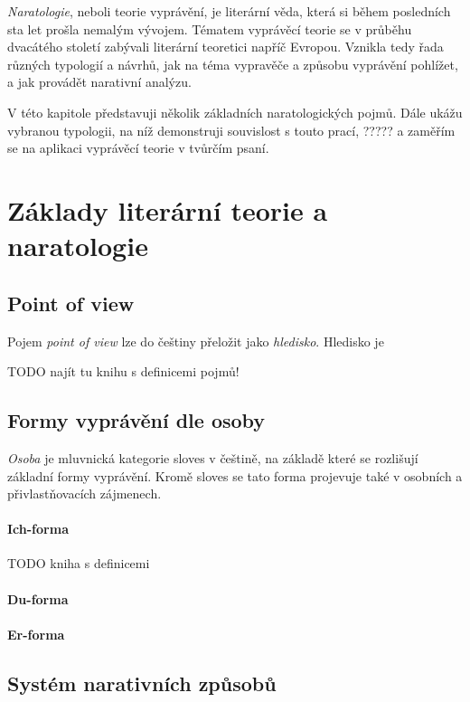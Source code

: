 \emph{Naratologie}, neboli teorie vyprávění, je literární věda, která si během posledních sta let prošla nemalým vývojem. Tématem vyprávěcí teorie se v průběhu dvacátého století zabývali literární teoretici napříč Evropou. Vznikla tedy řada různých typologií a návrhů, jak na téma vypravěče a způsobu vyprávění pohlížet, a jak provádět narativní analýzu.\cite{kubicek-vypravec}

V této kapitole představuji několik základních naratologických pojmů. Dále ukážu vybranou typologii, na níž demonstruji souvislost s touto prací, ????? a zaměřím se na aplikaci vyprávěcí teorie v tvůrčím psaní.

\section{Základy literární teorie a naratologie}

\subsection{Point of view}

Pojem \emph{point of view} lze do češtiny přeložit jako \emph{hledisko}. Hledisko je

TODO najít tu knihu s definicemi pojmů!

\subsection{Formy vyprávění dle osoby}

\emph{Osoba} je mluvnická kategorie sloves v češtině, na základě které se rozlišují základní formy vyprávění. Kromě sloves se tato forma projevuje také v osobních a přivlastňovacích zájmenech.

\paragraph{Ich-forma}

TODO kniha s definicemi

\paragraph{Du-forma}

\paragraph{Er-forma}

\subsection{Systém narativních způsobů}

